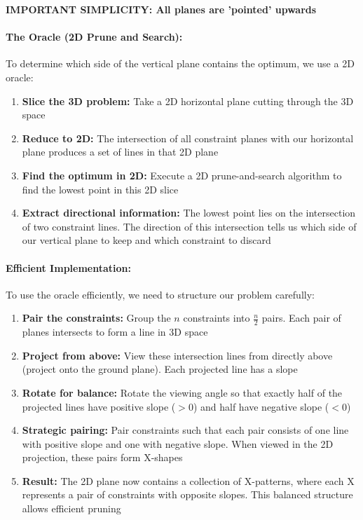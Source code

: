 \documentclass{article}
\begin{document}
\textbf{IMPORTANT SIMPLICITY: All planes are 'pointed' upwards}
\paragraph{The Oracle (2D Prune and Search):}

To determine which side of the vertical plane contains the optimum, we use a 2D oracle:

\begin{enumerate}
    \item \textbf{Slice the 3D problem:} Take a 2D horizontal plane cutting through the 3D space
    \item \textbf{Reduce to 2D:} The intersection of all constraint planes with our horizontal plane produces a set of lines in that 2D plane
    \item \textbf{Find the optimum in 2D:} Execute a 2D prune-and-search algorithm to find the lowest point in this 2D slice
    \item \textbf{Extract directional information:} The lowest point lies on the intersection of two constraint lines. The direction of this intersection tells us which side of our vertical plane to keep and which constraint to discard
\end{enumerate}
\paragraph{Efficient Implementation:}

To use the oracle efficiently, we need to structure our problem carefully:

\begin{enumerate}
    \item \textbf{Pair the constraints:} Group the $n$ constraints into $\frac{n}{2}$ pairs. Each pair of planes intersects to form a line in 3D space
    
    \item \textbf{Project from above:} View these intersection lines from directly above (project onto the ground plane). Each projected line has a slope
    
    \item \textbf{Rotate for balance:} Rotate the viewing angle so that exactly half of the projected lines have positive slope ($>0$) and half have negative slope ($<0$)
    
    \item \textbf{Strategic pairing:} Pair constraints such that each pair consists of one line with positive slope and one with negative slope. When viewed in the 2D projection, these pairs form X-shapes
    
    \item \textbf{Result:} The 2D plane now contains a collection of X-patterns, where each X represents a pair of constraints with opposite slopes. This balanced structure allows efficient pruning
\end{enumerate}
\end{document}
